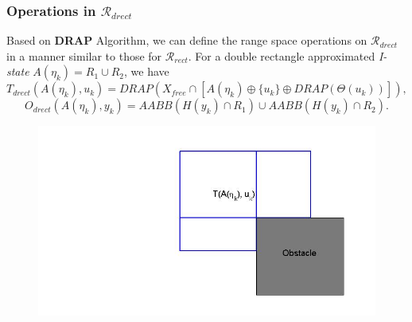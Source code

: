 \documentclass[compress]{beamer}
\begin{document}
\begin{frame} \frametitle{Operations in $\mathcal{R}_{drect}$}

Based on \textbf{DRAP} Algorithm, we can define the range space operations on
$\mathcal{R}_{drect}$ in a manner similar to those for $\mathcal{R}_{rect}$.  For a double rectangle
approximated \emph{I-state} $A(\eta_k) = R_1 \cup R_2$, we have
\begin{equation}
	T_{drect}(A(\eta_k), u_k) = DRAP(X_{free} \cap [A(\eta_k) \oplus \{ u_k \} \oplus DRAP(\Theta(u_k))]),
\end{equation}
\begin{equation}
	O_{drect}(A(\eta_k), y_k) = AABB(H(y_k) \cap R_1)\cup AABB(H(y_k) \cap R_2).
\end{equation}
\begin{figure}
    \includegraphics[scale=0.3]{drectevolve2.jpg}
    \end{figure}
\transboxout
\end{frame}
\end{document}
